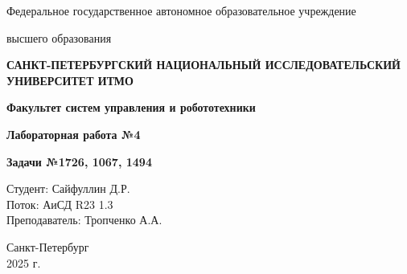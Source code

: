 \documentclass[a4paper,12pt]{article}
\begin{document}
\begin{titlepage}
    \centering
    {\large Федеральное государственное автономное образовательное учреждение\par}
    {\large высшего образования\par}
    {\bfseries САНКТ-ПЕТЕРБУРГСКИЙ НАЦИОНАЛЬНЫЙ ИССЛЕДОВАТЕЛЬСКИЙ УНИВЕРСИТЕТ ИТМО\par}
    {\bfseries Факультет систем управления и робототехники\par}
    \vfill
    {\Large \bfseries Лабораторная работа №4\par}
    {\Large \bfseries Задачи №1726, 1067, 1494\par}
    \vfill
    
    \begin{flushright}
        Студент: Сайфуллин Д.Р. \\
        Поток: АиСД R23 1.3 \\
        Преподаватель: Тропченко А.А.
    \end{flushright}
    \vfill
    Санкт-Петербург \\
    2025 г.
\end{titlepage}
\end{document}
